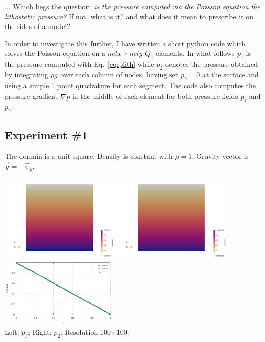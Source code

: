 ... Which begs the question: {\sl is the pressure computed via the Poisson equation the lithostatic pressure?} 
If not, what is it? and what does it mean to prescribe it on the sides of a model? 

\vspace{.5cm}

In order to investigate this further, I have written a short python code which solves the Poisson equation 
on a $nelx\times nely$ $Q_1$ elements.
In what follows $p_1$ is the pressure computed with Eq.~\eqref{eq:plith} while $p_2$ denotes the pressure
obtained by integrating $\rho {g}$ over each column of nodes, having set $p_2=0$ at the surface and 
using a simple 1 point quadrature for each segment.
	The code also computes the pressure gradient $\vec\nabla p$ in the middle of each element for both 
pressure fields $p_1$ and $p_2$. 

\newpage
\subsection*{Experiment \#1}

The domain is a unit square. Density is constant with $\rho=1$. Gravity vector is $\vec{g}=-\vec{e}_y$.

\begin{center}
\includegraphics[width=5.7cm]{python_codes/fieldstone_119/results/exp1/p1}
\includegraphics[width=5.7cm]{python_codes/fieldstone_119/results/exp1/p2}
\includegraphics[width=5.7cm]{python_codes/fieldstone_119/results/exp1/profile.pdf}\\
{\captionfont Left: $p_1$; Right: $p_2$. Resolution 100$\times$100.}
\end{center}

